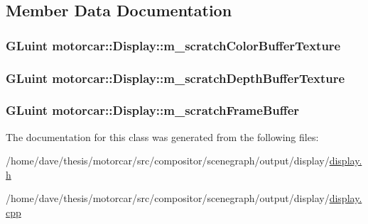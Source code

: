 \subsection{Member Data Documentation}
\hypertarget{classmotorcar_1_1Display_a8948636502d6498b53fbb644a9064390}{
\subsubsection[{m\-\_\-scratch\-Color\-Buffer\-Texture}]{\setlength{\rightskip}{0pt plus 5cm}G\-Luint motorcar\-::\-Display\-::m\-\_\-scratch\-Color\-Buffer\-Texture\hspace{0.3cm}{\ttfamily [protected]}}}\label{classmotorcar_1_1Display_a8948636502d6498b53fbb644a9064390}
\hypertarget{classmotorcar_1_1Display_a32e11a89219cf0727cd85b19a30f21a6}{
\subsubsection[{m\-\_\-scratch\-Depth\-Buffer\-Texture}]{\setlength{\rightskip}{0pt plus 5cm}G\-Luint motorcar\-::\-Display\-::m\-\_\-scratch\-Depth\-Buffer\-Texture\hspace{0.3cm}{\ttfamily [protected]}}}\label{classmotorcar_1_1Display_a32e11a89219cf0727cd85b19a30f21a6}
\hypertarget{classmotorcar_1_1Display_a23f2535f375102eda1ba2cba2b2a03a4}{
\subsubsection[{m\-\_\-scratch\-Frame\-Buffer}]{\setlength{\rightskip}{0pt plus 5cm}G\-Luint motorcar\-::\-Display\-::m\-\_\-scratch\-Frame\-Buffer\hspace{0.3cm}{\ttfamily [protected]}}}\label{classmotorcar_1_1Display_a23f2535f375102eda1ba2cba2b2a03a4}


The documentation for this class was generated from the following files\-:\begin{DoxyCompactItemize}
\item 
/home/dave/thesis/motorcar/src/compositor/scenegraph/output/display/\hyperlink{display_8h}{display.\-h}\item 
/home/dave/thesis/motorcar/src/compositor/scenegraph/output/display/\hyperlink{display_8cpp}{display.\-cpp}\end{DoxyCompactItemize}
